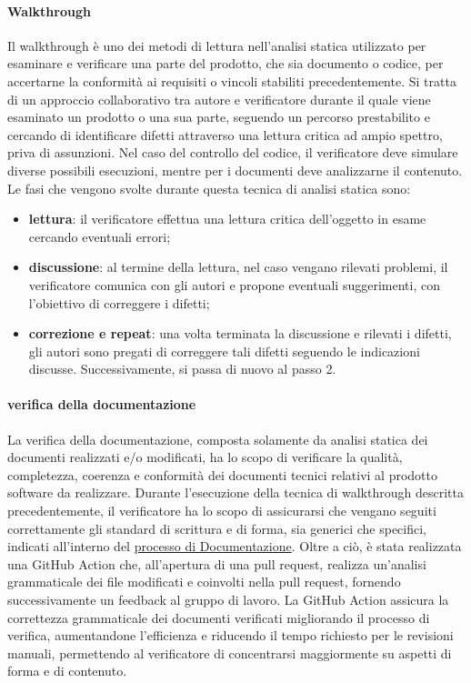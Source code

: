 \paragraph{Walkthrough}
Il walkthrough è uno dei metodi di lettura nell'analisi statica utilizzato per esaminare e verificare una parte del prodotto, che sia documento o codice, per accertarne la conformità ai requisiti o vincoli stabiliti precedentemente.
Si tratta di un approccio collaborativo tra autore e verificatore durante il quale viene esaminato un prodotto o una sua parte, seguendo un percorso prestabilito e cercando di identificare difetti attraverso una lettura critica ad ampio spettro, priva di assunzioni.
Nel caso del controllo del codice, il verificatore deve simulare diverse possibili esecuzioni, mentre per i documenti deve analizzarne il contenuto.
Le fasi che vengono svolte durante questa tecnica di analisi statica sono:
\begin{itemize}
    \item \textbf{lettura}: il verificatore effettua una lettura critica dell'oggetto in esame cercando eventuali errori;
    \item \textbf{discussione}: al termine della lettura, nel caso vengano rilevati problemi, il verificatore comunica con gli autori e propone eventuali suggerimenti, con l'obiettivo di correggere i difetti;
    \item \textbf{correzione e repeat}: una volta terminata la discussione e rilevati i difetti, gli autori sono pregati di correggere tali difetti seguendo le indicazioni discusse. Successivamente, si passa di nuovo al passo 2.
\end{itemize}
\paragraph{verifica della documentazione}
La verifica della documentazione, composta solamente da analisi statica dei documenti realizzati e/o modificati, ha lo scopo di verificare
la qualità, completezza, coerenza e conformità dei documenti tecnici relativi al prodotto software da realizzare.
Durante l'esecuzione della tecnica di walkthrough descritta precedentemente, il verificatore ha lo scopo di 
assicurarsi che vengano seguiti correttamente gli standard di scrittura e di forma, sia generici che specifici, indicati all'interno
del \hyperref[subsec:documentazione]{processo di Documentazione}.
Oltre a ciò, è stata realizzata una GitHub Action che, all'apertura di una pull request, realizza un'analisi grammaticale dei file 
modificati e coinvolti nella pull request, fornendo successivamente un feedback al gruppo di lavoro.
La GitHub Action assicura la correttezza grammaticale dei documenti verificati migliorando il processo di verifica, aumentandone l'efficienza 
e riducendo il tempo richiesto per le revisioni manuali, permettendo al verificatore di concentrarsi maggiormente su aspetti 
di forma e di contenuto.

